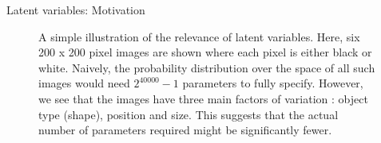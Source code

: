 \begin{frame}{Latent variables: Motivation}
  \begin{figure}
    \centering
\caption{\footnotesize A simple illustration of the relevance of latent variables. Here, six 200 x 200 pixel images are shown where each pixel is either black or white. Naively, the probability distribution over the space of all such images would need $2^{40000}-1$ parameters to fully specify. However, we see that the images have three main factors of variation : object type (shape), position and size. This suggests that the actual number of parameters required might be significantly fewer. }
 \end{figure}
\end{frame}


 



